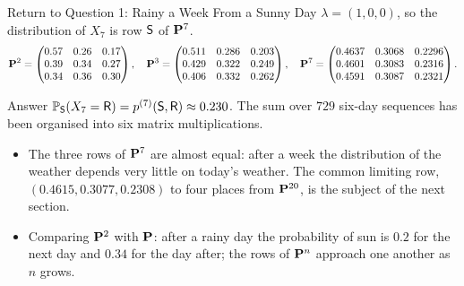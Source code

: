 \begin{frame}{Return to Question 1: Rainy a Week From a Sunny Day}
  \label{fr:q1}
  \small
  $\lambda=(1,0,0)$, so the distribution of $X_7$ is row $\mathsf{S}$ of $\mathbf{P}^7$.
  {\setlength{\arraycolsep}{3pt}
  \[
    \mathbf{P}^2=\begin{pmatrix}0.57&0.26&0.17\\0.39&0.34&0.27\\0.34&0.36&0.30\end{pmatrix},\quad
    \mathbf{P}^3=\begin{pmatrix}0.511&0.286&0.203\\0.429&0.322&0.249\\0.406&0.332&0.262\end{pmatrix},\quad
    \mathbf{P}^7=\begin{pmatrix}0.4637&0.3068&0.2296\\0.4601&0.3083&0.2316\\0.4591&0.3087&0.2321\end{pmatrix}.
  \]}
  \begin{exampleblock}{Answer}
    $\mathbb{P}_{\mathsf{S}}(X_7=\mathsf{R})=p^{(7)}(\mathsf{S},\mathsf{R})\approx0.230$. The sum over $729$ six-day sequences has been organised into six matrix multiplications.
  \end{exampleblock}
  \begin{itemize}
    \item The three rows of $\mathbf{P}^7$ are almost equal: after a week the distribution of the weather depends very little on today's weather. The common limiting row, $(0.4615,0.3077,0.2308)$ to four places from $\mathbf{P}^{20}$, is the subject of the next section.
    \item Comparing $\mathbf{P}^2$ with $\mathbf{P}$: after a rainy day the probability of sun is $0.2$ for the next day and $0.34$ for the day after; the rows of $\mathbf{P}^n$ approach one another as $n$ grows.
  \end{itemize}
\end{frame}

